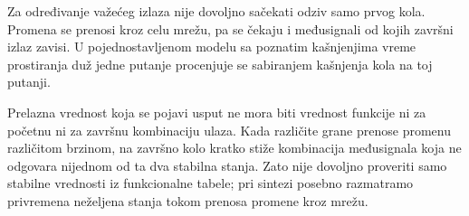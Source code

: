 
Za određivanje važećeg izlaza nije dovoljno sačekati odziv samo prvog kola. Promena se prenosi kroz celu mrežu, pa se čekaju i međusignali od kojih završni izlaz zavisi. U pojednostavljenom modelu sa poznatim kašnjenjima vreme prostiranja duž jedne putanje procenjuje se sabiranjem kašnjenja kola na toj putanji.

Prelazna vrednost koja se pojavi usput ne mora biti vrednost funkcije ni za početnu ni za završnu kombinaciju ulaza. Kada različite grane prenose promenu različitom brzinom, na završno kolo kratko stiže kombinacija međusignala koja ne odgovara nijednom od ta dva stabilna stanja. Zato nije dovoljno proveriti samo stabilne vrednosti iz funkcionalne tabele; pri sintezi posebno razmatramo privremena neželjena stanja tokom prenosa promene kroz mrežu.

